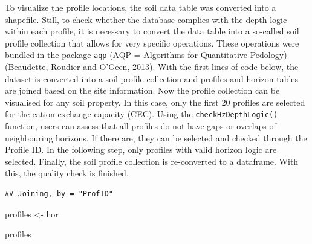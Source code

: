 \documentclass[
  10pt,
  b5paper,
  oneside]{book}
\newenvironment{Shaded}{\begin{snugshade}}{\end{snugshade}}
\newcommand{\DocumentationTok}[1]{\textcolor[rgb]{0.56,0.35,0.01}{\textbf{\textit{#1}}}}
\newcommand{\FunctionTok}[1]{\textcolor[rgb]{0.00,0.00,0.00}{#1}}
\newcommand{\NormalTok}[1]{#1}
\newcommand{\OtherTok}[1]{\textcolor[rgb]{0.56,0.35,0.01}{#1}}
\newcommand{\SpecialCharTok}[1]{\textcolor[rgb]{0.00,0.00,0.00}{#1}}
\begin{document}
To visualize the profile locations, the soil data table was converted into a shapefile. Still, to check whether the database complies with the depth logic within each profile, it is necessary to convert the data table into a so-called soil profile collection that allows for very specific operations. These operations were bundled in the package \texttt{aqp} (AQP = Algorithms for Quantitative Pedology) (\protect\hyperlink{ref-beaudette2013}{Beaudette, Roudier and O'Geen, 2013}).
With the first lines of code below, the dataset is converted into a soil profile collection and profiles and horizon tables are joined based on the site information.
Now the profile collection can be visualised for any soil property. In this case, only the first 20 profiles are selected for the cation exchange capacity (CEC).
Using the \texttt{checkHzDepthLogic()} function, users can assess that all profiles do not have gaps or overlaps of neighbouring horizons. If there are, they can be selected and checked through the Profile ID. In the following step, only profiles with valid horizon logic are selected. Finally, the soil profile collection is re-converted to a dataframe. With this, the quality check is finished.

\begin{Shaded}
\end{Shaded}

\begin{verbatim}
## Joining, by = "ProfID"
\end{verbatim}

\begin{Shaded}
\begin{Highlighting}[]
\NormalTok{profiles }\OtherTok{\textless{}{-}}\NormalTok{ hor}

\NormalTok{profiles}
\end{Highlighting}
\end{Shaded}
\end{document}
